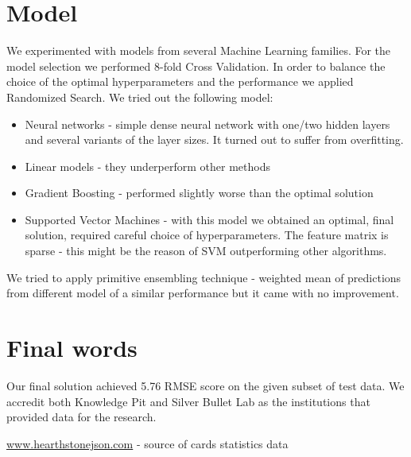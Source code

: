 \documentclass[a4paper]{article}
\begin{document}
\section{Model}
We experimented with models from several Machine Learning families.
For the model selection we performed 8-fold Cross Validation. 
In order to balance the choice of the optimal hyperparameters and the performance we applied Randomized Search.
We tried out the following model:
\begin{itemize}
\item Neural networks - simple dense neural network with one/two hidden layers and several variants of the layer sizes. It turned out to suffer from overfitting.
\item Linear models - they underperform other methods
\item Gradient Boosting - performed slightly worse than the optimal solution
\item Supported Vector Machines - with this model we obtained an optimal, final solution, required careful choice of hyperparameters.
The feature matrix is sparse - this might be the reason of SVM outperforming other algorithms.
\end{itemize}



We tried to apply primitive ensembling technique - weighted mean of predictions from different model of a similar performance but it came with no improvement.

\section{Final words}
Our final solution achieved 5.76 RMSE score on the given subset of test data. We accredit both Knowledge Pit and Silver Bullet Lab as the institutions that provided data for the research.

\begin{thebibliography}{9}
 \url{www.hearthstonejson.com} - source of cards statistics data



\end{thebibliography}
\end{document}
